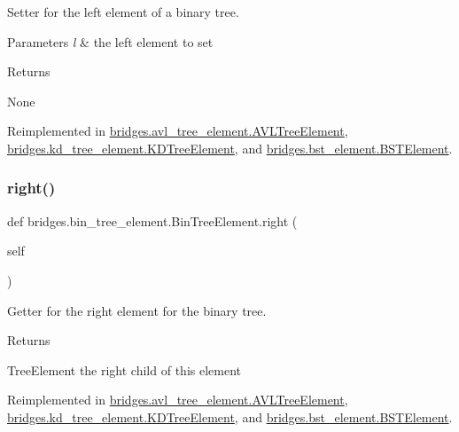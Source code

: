 Setter for the left element of a binary tree. 


\begin{DoxyParams}{Parameters}
{\em l} & the left element to set \\
\hline
\end{DoxyParams}
\begin{DoxyReturn}{Returns}


None 
\end{DoxyReturn}


Reimplemented in \mbox{\hyperlink{classbridges_1_1avl__tree__element_1_1_a_v_l_tree_element_a5ee29c8a42e07019a77ecd7a2534f8be}{bridges.\+avl\+\_\+tree\+\_\+element.\+A\+V\+L\+Tree\+Element}}, \mbox{\hyperlink{classbridges_1_1kd__tree__element_1_1_k_d_tree_element_a784bad6511dae3a7c769672d2d3af14f}{bridges.\+kd\+\_\+tree\+\_\+element.\+K\+D\+Tree\+Element}}, and \mbox{\hyperlink{classbridges_1_1bst__element_1_1_b_s_t_element_a0b45e63b73faabb6b969dd6222e07942}{bridges.\+bst\+\_\+element.\+B\+S\+T\+Element}}.

\mbox{\label{classbridges_1_1bin__tree__element_1_1_bin_tree_element_adb7eaa3c67233aa5c368e8907043f451}} 
\subsubsection{\texorpdfstring{right()}{right()}\hspace{0.1cm}{\footnotesize\ttfamily [1/2]}}
{\footnotesize\ttfamily def bridges.\+bin\+\_\+tree\+\_\+element.\+Bin\+Tree\+Element.\+right (\begin{DoxyParamCaption}\item[{}]{self }\end{DoxyParamCaption})}



Getter for the right element for the binary tree. 

\begin{DoxyReturn}{Returns}


Tree\+Element the right child of this element 
\end{DoxyReturn}


Reimplemented in \mbox{\hyperlink{classbridges_1_1avl__tree__element_1_1_a_v_l_tree_element_aaab3b79617e7e503b1a7c28069d1eb15}{bridges.\+avl\+\_\+tree\+\_\+element.\+A\+V\+L\+Tree\+Element}}, \mbox{\hyperlink{classbridges_1_1kd__tree__element_1_1_k_d_tree_element_acbcfa46ba613daaf922d8b632b795a86}{bridges.\+kd\+\_\+tree\+\_\+element.\+K\+D\+Tree\+Element}}, and \mbox{\hyperlink{classbridges_1_1bst__element_1_1_b_s_t_element_a3ec82fbc56a5e6309b69d2d963b483fd}{bridges.\+bst\+\_\+element.\+B\+S\+T\+Element}}.

